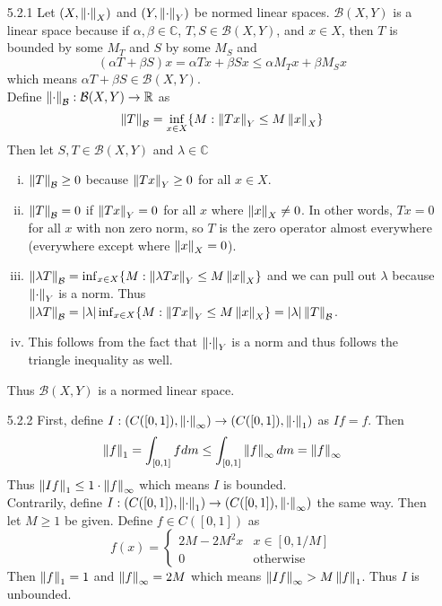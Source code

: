\documentclass[../../Solutions.tex]{subfiles}
\begin{document}
\begin{itemize}
	\item [5.2.1] Let $(X,\left\lVert\cdot\right\rVert_X)$ and $(Y,\left\lVert\cdot\right\rVert_Y)$ be normed linear spaces.
		$\mathcal{B}(X,Y)$ is a linear space because if $\alpha,\beta \in \mathbb{C}$, $T,S \in \mathcal{B}(X,Y)$, and $x \in X$, then $T$ is bounded by some $M_T$ and $S$ by some $M_S$ and
		$$ (\alpha T + \beta S)x = \alpha Tx + \beta Sx \leq \alpha M_T x + \beta M_S x $$
		which means $\alpha T + \beta S \in \mathcal{B}(X,Y)$. \\
		Define $\left\lVert\cdot\right\rVert_\mathcal{B}:\mathcal{B}(X,Y)\to\mathbb{R}$ as
		$$ \left\lVert T\right\rVert_\mathcal{B} = \inf_{x\in X}\{M:\left\lVert Tx\right\rVert_Y\leq M\left\lVert x\right\rVert_X\} $$
		Then let $S,T \in \mathcal{B}(X,Y)$ and $\lambda \in \mathbb{C}$
		\begin{enumerate}[(i)]
			\item $\left\lVert T\right\rVert_\mathcal{B} \geq 0$ because $\left\lVert Tx\right\rVert_Y \geq 0$ for all $x \in X$.
			\item $\left\lVert T\right\rVert_\mathcal{B} = 0$ if $\left\lVert Tx\right\rVert_Y = 0$ for all $x$ where $\left\lVert x\right\rVert_X \neq 0$.
				In other words, $Tx = 0$ for all $x$ with non zero norm, so $T$ is the zero operator almost everywhere (everywhere except where $\left\lVert x\right\rVert_X = 0$).
			\item $\left\lVert\lambda T\right\rVert_\mathcal{B} = \inf_{x\in X}\{M:\left\lVert\lambda Tx\right\rVert_Y \leq M\left\lVert x\right\rVert_X \}$ and we can pull out $\lambda$ because $\left\lVert\cdot\right\rVert_Y$ is a norm. Thus $\left\lVert\lambda T\right\rVert_\mathcal{B} = |\lambda|\inf_{x\in X}\{M:\left\lVert Tx\right\rVert_Y \leq M\left\lVert x\right\rVert_X \} = |\lambda|\left\lVert T\right\rVert_\mathcal{B}$.
			\item This follows from the fact that $\left\lVert\cdot\right\rVert_Y$ is a norm and thus follows the triangle inequality as well.
		\end{enumerate}
		Thus $\mathcal{B}(X,Y)$ is a normed linear space.
	
	\item [5.2.2] First, define $I:(C([0,1]),\left\lVert\cdot\right\rVert_\infty)\to(C([0,1]),\left\lVert\cdot\right\rVert_1)$ as $If = f$.
		Then
		$$ \left\lVert f\right\rVert_1 = \int_{[0,1]} f dm \leq \int_{[0,1]} \left\lVert f\right\rVert_\infty dm = \left\lVert f\right\rVert_\infty $$
		Thus $\left\lVert If\right\rVert_1 \leq 1\cdot\left\lVert f\right\rVert_\infty$ which means $I$ is bounded. \\
		Contrarily, define $I:(C([0,1]),\left\lVert\cdot\right\rVert_1)\to(C([0,1]),\left\lVert\cdot\right\rVert_\infty)$ the same way.
		Then let $M \geq 1$ be given.
		Define $f \in C([0,1])$ as
		\begin{equation*}
			f(x) = \begin{cases}
				2M - 2M^2x & x \in [0,1/M] \\
				0 & \text{otherwise}
			\end{cases}
		\end{equation*}
		Then $\left\lVert f\right\rVert_1 = 1$ and $\left\lVert f\right\rVert_\infty = 2M$ which means $\left\lVert If\right\rVert_\infty > M\left\lVert f\right\rVert_1$.
		Thus $I$ is unbounded.
	

\end{itemize}
\end{document}
